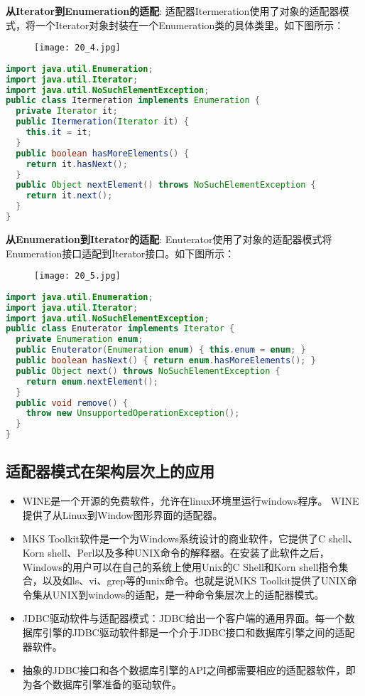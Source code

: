 \documentclass[../main.tex]{subfiles}
\begin{document}
\textbf{从Iterator到Enumeration的适配}:
适配器Itermeration使用了对象的适配器模式，将一个Iterator对象封装在一个Enumeration类的具体类里。如下图所示：
%
\begin{figure}[H]
  \texttt{[image: 20\_4.jpg]}
\end{figure}
%
\begin{lstlisting}[language=java]
import java.util.Enumeration;
import java.util.Iterator;
import java.util.NoSuchElementException;
public class Itermeration implements Enumeration {
  private Iterator it;
  public Itermeration(Iterator it) {
    this.it = it;
  }
  public boolean hasMoreElements() {
    return it.hasNext();
  }
  public Object nextElement() throws NoSuchElementException {
    return it.next();
  }
}
\end{lstlisting}
%
\textbf{从Enumeration到Iterator的适配}:
Enuterator使用了对象的适配器模式将Enumeration接口适配到Iterator接口。如下图所示：
%
\begin{figure}[H]
  \texttt{[image: 20\_5.jpg]}
\end{figure}
%
\begin{lstlisting}[language=java]
import java.util.Enumeration;
import java.util.Iterator;
import java.util.NoSuchElementException;
public class Enuterator implements Iterator {
  private Enumeration enum;
  public Enuterator(Enumeration enum) { this.enum = enum; }
  public boolean hasNext() { return enum.hasMoreElements(); }
  public Object next() throws NoSuchElementException {
    return enum.nextElement();
  }
  public void remove() {
    throw new UnsupportedOperationException();
  }
}
\end{lstlisting}
%
\subsection{适配器模式在架构层次上的应用}
\begin{itemize}
  \item WINE是一个开源的免费软件，允许在linux环境里运行windows程序。 WINE提供了从Linux到Window图形界面的适配器。
  \item MKS Toolkit软件是一个为Windows系统设计的商业软件，它提供了C shell、Korn shell、Perl以及多种UNIX命令的解释器。在安装了此软件之后，Windows的用户可以在自己的系统上使用Unix的C Shell和Korn shell指令集合，以及如ls、vi、grep等的unix命令。也就是说MKS Toolkit提供了UNIX命令集从UNIX到windows的适配，是一种命令集层次上的适配器模式。
  \item JDBC驱动软件与适配器模式：JDBC给出一个客户端的通用界面。每一个数据库引擎的JDBC驱动软件都是一个介于JDBC接口和数据库引擎之间的适配器软件。
  \item 抽象的JDBC接口和各个数据库引擎的API之间都需要相应的适配器软件，即为各个数据库引擎准备的驱动软件。
\end{itemize}
\end{document}
